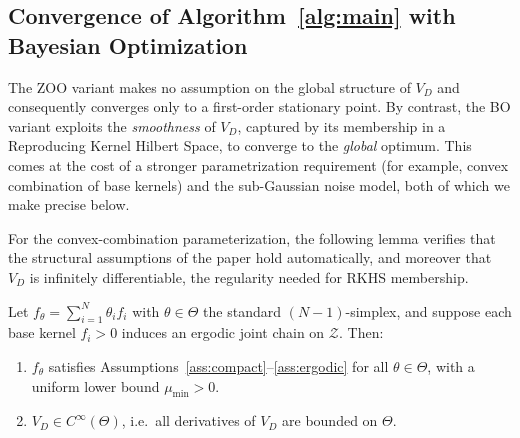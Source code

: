 \documentclass[12pt]{article}
\renewcommand{\[}{\left[}
\renewcommand{\]}{\right]}
\renewcommand{\(}{\left(}
\renewcommand{\)}{\right)}
\newcounter{l1}
\newcounter{l2}
\newcounter{l3}
\begin{document}
\subsection{Convergence of Algorithm~\ref{alg:main} with Bayesian Optimization}
\label{sec:bo_convergence}

The ZOO variant makes no assumption on the global structure of $V_D$ and consequently
converges only to a first-order stationary point. By contrast, the BO variant exploits
the \emph{smoothness} of $V_D$, captured by its membership in a Reproducing Kernel
Hilbert Space, to converge to the \emph{global} optimum. This comes at the cost of a
stronger parametrization requirement (for example, convex combination of base kernels) and the
sub-Gaussian noise model, both of which we make precise below.

For the convex-combination parameterization, the following lemma verifies that the
structural assumptions of the paper hold automatically, and moreover that $V_D$ is
infinitely differentiable, the regularity needed for RKHS membership.

\begin{lemma}\label{lem:convex_kernel}
Let $f_\theta = \sum_{i=1}^N \theta_i f_i$ with $\theta\in\Theta$ the standard
$(N-1)$-simplex, and suppose each base kernel $f_i > 0$ induces an ergodic joint chain
on $\mathcal{Z}$. Then:
\begin{enumerate}
  \item[\normalfont(i)] $f_\theta$ satisfies
    Assumptions~\ref{ass:compact}--\ref{ass:ergodic} for all $\theta\in\Theta$, with
    a uniform lower bound $\mu_{\min}>0$.
  \item[\normalfont(ii)] $V_D \in C^\infty(\Theta)$, i.e.\ all derivatives of $V_D$
    are bounded on $\Theta$.
\end{enumerate}
\end{lemma}
\end{document}
